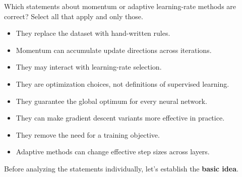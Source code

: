 \newpage

\noindent
\exercise[1.5] Which statements about momentum or adaptive learning-rate methods are correct? Select all that apply and only those.
\begin{itemize}
    \item They replace the dataset with hand-written rules.
    \item Momentum can accumulate update directions across iterations.
    \item They may interact with learning-rate selection.
    \item They are optimization choices, not definitions of supervised learning.
    \item They guarantee the global optimum for every neural network.
    \item They can make gradient descent variants more effective in practice.
    \item They remove the need for a training objective.
    \item Adaptive methods can change effective step sizes across layers.
\end{itemize}
\solution Before analyzing the statements individually, let's establish the \textbf{basic idea}.

